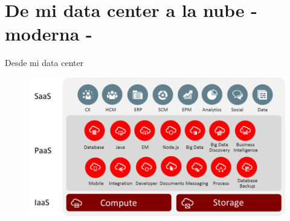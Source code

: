 \documentclass[aspectratio=169]{beamer}
\begin{document}
{
    \section{De mi data center a la nube - moderna -}
}


\begin{frame}[fragile]{Desde mi data center}
    \begin{figure}
        \centering
        \includegraphics[width=\linewidth]{Images/cloud}
    \end{figure}
\end{frame}
\end{document}
